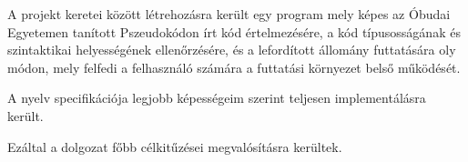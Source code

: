 A projekt keretei között létrehozásra került egy program mely képes az Óbudai Egyetemen tanított Pszeudokódon írt kód értelmezésére, a kód típusosságának és szintaktikai helyességének ellenőrzésére, és a lefordított állomány futtatására oly módon, mely felfedi a felhasználó számára a futtatási környezet belső működését.

A nyelv specifikációja legjobb képességeim szerint teljesen implementálásra került. 

Ezáltal a dolgozat főbb célkitűzései megvalósításra kerültek.
